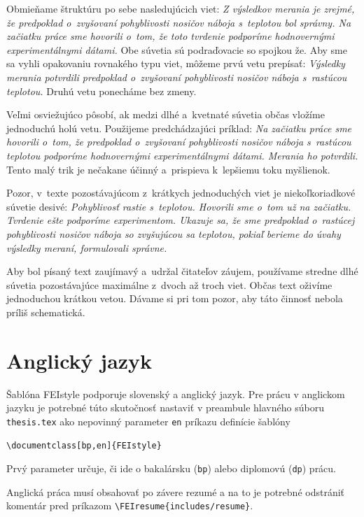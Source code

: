 Obmieňame štruktúru po sebe nasledujúcich viet:
\emph{Z výsledkov merania je zrejmé,
že predpoklad o~zvyšovaní pohyblivosti nosičov náboja
s~teplotou bol správny.
Na začiatku práce sme hovorili o~tom,
že toto tvrdenie podporíme hodnovernými experimentálnymi dátami.}
Obe súvetia sú podraďovacie so spojkou že.
Aby sme sa vyhli opakovaniu rovnakého typu viet,
môžeme prvú vetu prepísať:
\emph{Výsledky merania potvrdili predpoklad o~zvyšovaní
pohyblivosti nosičov náboja s~rastúcou teplotou.}
Druhú vetu ponecháme bez zmeny.

Veľmi osviežujúco pôsobí, ak medzi dlhé a~kvetnaté súvetia
občas vložíme jednoduchú holú vetu.
Použijeme predchádzajúci príklad:
\emph{Na začiatku práce sme hovorili o~tom,
že predpoklad o~zvyšovaní pohyblivosti nosičov náboja
s~rastúcou teplotou podporíme hodnovernými
experimentálnymi dátami.
Merania ho potvrdili.}
Tento malý trik je nečakane účinný a~prispieva k~lepšiemu
toku myšlienok.

Pozor, v~texte pozostávajúcom z~krátkych jednoduchých viet
je niekoľkoriadkové súvetie desivé:
\emph{Pohyblivosť rastie s~teplotou.
Hovorili sme o~tom už na začiatku.
Tvrdenie ešte podporíme experimentom.
Ukazuje sa, že sme predpoklad o~rastúcej pohyblivosti
nosičov náboja so zvyšujúcou sa teplotou,
pokiaľ berieme do úvahy výsledky meraní,
formulovali správne.}

Aby bol písaný text zaujímavý a~udržal čitateľov záujem,
používame stredne dlhé súvetia pozostávajúce maximálne
z~dvoch až troch viet.
Občas text oživíme jednoduchou krátkou vetou.
Dávame si pri tom pozor,
aby táto činnosť nebola príliš schematická.

\section{Anglický jazyk}
Šablóna FEIstyle podporuje slovenský a anglický jazyk.
Pre prácu v anglickom jazyku je potrebné túto skutočnosť nastaviť v preambule hlavného súboru \verb|thesis.tex| ako nepovinný parameter \verb|en| príkazu definície šablóny
\begin{trivlist}
\item \texttt{\textbackslash documentclass[bp,en]\{FEIstyle\}}
\end{trivlist}
Prvý parameter určuje, či ide o bakalársku (\verb|bp|) alebo diplomovú (\verb|dp|) prácu.

Anglická práca musí obsahovať po závere rezumé a na to je potrebné odstrániť komentár pred príkazom
\verb|\FEIresume{includes/resume}|.

